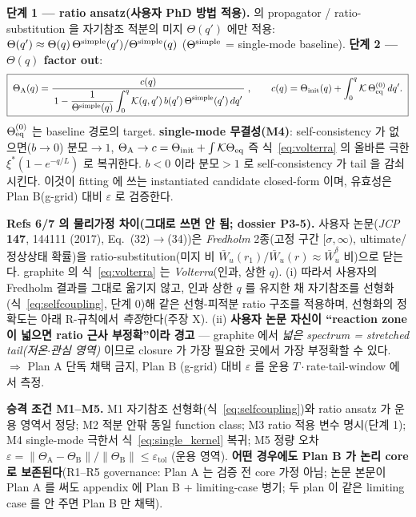 \textbf{단계 1 — ratio ansatz(사용자 PhD 방법 적용).} \cite{lee2011,son2013} 의 propagator /
ratio-substitution 을 자기참조 적분의 미지 $\Theta(q')$ 에만 적용:
$\Theta(q')\approx\Theta(q)\,\Theta^{\mathrm{simple}}(q')/\Theta^{\mathrm{simple}}(q)$ ($\Theta^{\mathrm{simple}}$ =
single-mode baseline). \textbf{단계 2 — $\Theta(q)$ factor out}:
\begin{equation}
\boxed{\;\Theta_\mathrm A(q)=\frac{c(q)}
{\,1-\dfrac{1}{\Theta^{\mathrm{simple}}(q)}\displaystyle\int_0^q\mathcal K(q,q')\,b(q')\,\Theta^{\mathrm{simple}}(q')\,dq'\,}\;,
\qquad c(q)=\Theta_\mathrm{init}(q)+\int_0^q\mathcal K\,\Theta_{\mathrm{eq}}^{(0)}\,dq'.\;}
\label{eq:closed}
\end{equation}
$\Theta_{\mathrm{eq}}^{(0)}$ 는 baseline 경로의 target. \textbf{single-mode 무결성(M4)}: self-consistency 가
없으면($b\to0$) 분모$\to1$, $\Theta_\mathrm A\to c=\Theta_\mathrm{init}+\int\mathcal K\Theta_{\mathrm{eq}}$ 즉
식~\eqref{eq:volterra} 의 올바른 극한 $\xi^\ast(1-e^{-q/L})$ 로 복귀한다. $b<0$ 이라 분모$>1$ 로
self-consistency 가 tail 을 감쇠시킨다. 이것이 fitting 에 쓰는 instantiated candidate closed-form 이며,
유효성은 Plan B(g-grid) 대비 $\varepsilon$ 로 검증한다.
\begin{boundbox}
\textbf{Refs 6/7 의 물리가정 차이(그대로 쓰면 안 됨; dossier P3-5).} 사용자 논문(\emph{JCP} \textbf{147},
144111 (2017), Eq.\ (32)$\to$(34))은 \emph{Fredholm} 2종(고정 구간 $[\sigma,\infty)$, ultimate/정상상태
확률)을 ratio-substitution(미지 비 $\bar W_u(r_1)/\bar W_u(r)\approx\bar W_u^\delta$ 비)으로 닫는다.
graphite 의 식~\eqref{eq:volterra} 는 \emph{Volterra}(인과, 상한 $q$). (i) 따라서 사용자의 Fredholm
결과를 그대로 옮기지 않고, 인과 상한 $q$ 를 유지한 채 자기참조를 선형화(식~\eqref{eq:selfcoupling}, 단계 0)해
같은 선형-피적분 ratio 구조를 적용하며, 선형화의 정확도는 아래 R-규칙에서 \emph{측정}한다(주장 X).
(ii) \textbf{사용자 논문 자신이 ``reaction zone 이 넓으면 ratio 근사
부정확''이라 경고} — graphite 에서 \emph{넓은 spectrum = stretched tail(저온$\cdot$관심 영역)} 이므로
closure 가 가장 필요한 곳에서 가장 부정확할 수 있다. $\Rightarrow$ Plan A 단독 채택 금지, Plan B
(g-grid) 대비 $\varepsilon$ 를 운용 $T\cdot$rate$\cdot$tail-window 에서 측정.
\end{boundbox}
\textbf{승격 조건 M1--M5.} M1 자기참조 선형화(식~\eqref{eq:selfcoupling})와 ratio ansatz 가 운용 영역서 정당; M2 적분 안팎 동일 function class;
M3 ratio 적용 변수 명시(단계 1); M4 single-mode 극한서 식~\eqref{eq:single_kernel} 복귀; M5 정량 오차
$\varepsilon=\lVert\Theta_\mathrm A-\Theta_\mathrm B\rVert/\lVert\Theta_\mathrm B\rVert\le\varepsilon_\mathrm{tol}$
(운용 영역). \textbf{어떤 경우에도 Plan B 가 논리 core 로 보존된다}(R1--R5 governance: Plan A 는 검증 전
core 가정 아님; 논문 본문이 Plan A 를 써도 appendix 에 Plan B + limiting-case 병기; 두 plan 이 같은
limiting case 를 안 주면 Plan B 만 채택).

